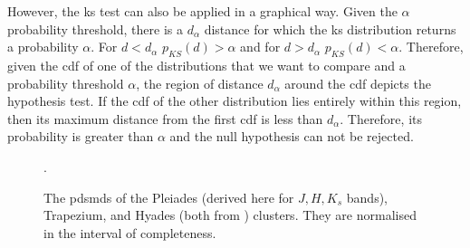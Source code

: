 However, the \gls{ks} test can also be applied in a graphical way. Given the $\alpha$ probability threshold, there is a $d_{\alpha}$ distance for which the \gls{ks} distribution returns a probability $\alpha$. For $d < d_{\alpha}$ $p_{KS}(d) > \alpha$ and for $d > d_{\alpha}$ $p_{KS}(d) < \alpha$. Therefore, given the \gls{cdf} of one of the distributions that we want to compare and a probability threshold $\alpha$, the region of distance $d_{\alpha}$ around the \gls{cdf} depicts the hypothesis test. If the \gls{cdf} of the other distribution lies entirely within this region, then its maximum distance from the first \gls{cdf} is less than $d_{\alpha}$. Therefore, its probability is greater than $\alpha$ and the null hypothesis can not be rejected.

\begin{figure}[htp]
\begin{center}
\caption{The \glspl{pdsmd} of the Pleiades (derived here for $J,H,K_s$ bands), Trapezium, and Hyades (both from \citet{Bouy2015}) clusters. They are normalised in the interval of completeness.}
\label{fig:PDSMDcomparison}.
\end{center}
\end{figure}

